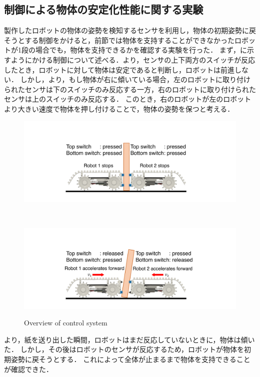 \subsection{制御による物体の安定化性能に関する実験}
製作したロボットの物体の姿勢を検知するセンサを利用し，物体の初期姿勢に戻そうとする制御をかけると，前節では物体を支持することができなかったロボットが1段の場合でも，物体を支持できるかを確認する実験を行った．
まず，に示すようにかける制御について述べる．より，センサの上下両方のスイッチが反応したとき，ロボットに対して物体は安定であると判断し，ロボットは前進しない．
しかし，より，もし物体が右に傾いている場合，左のロボットに取り付けられたセンサは下のスイッチのみ反応する一方，右のロボットに取り付けられたセンサは上のスイッチのみ反応する．
このとき，右のロボットが左のロボットより大きい速度で物体を押し付けることで，物体の姿勢を保つと考える．
\begin{figure}[tb]
  \begin{minipage}{\hsize}
  \centering
  \includegraphics[width=0.65\columnwidth]{figures/control-upright-v3.pdf}
  \label{fig:upright}
 \end{minipage}\\
 \begin{minipage}{\hsize}
  \centering
  \includegraphics[width=0.65\columnwidth]{figures/control-tilted-v3.pdf}
  \label{fig:tilted}
 \end{minipage}
 \caption{Overview of control system}
 \label{fig:control-figure}
\end{figure}
より，紙を送り出した瞬間，ロボットはまだ反応していないときに，物体は傾いた．
しかし，その後はロボットのセンサが反応するため，ロボットが物体を初期姿勢に戻そうとする．
これによって全体が止まるまで物体を支持できることが確認できた．
